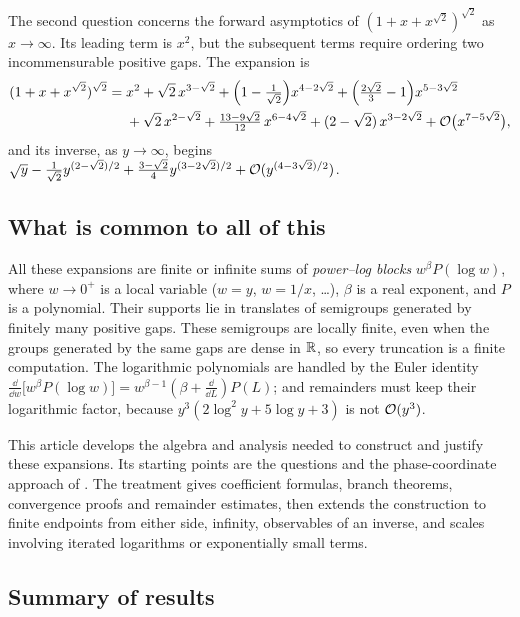 The second question \cite{q2} concerns the forward asymptotics of $(1+x+x^{\sqrt2})^{\sqrt2}$ as $x\to\infty$. Its leading term is $x^2$, but the subsequent terms require ordering two incommensurable positive gaps. The expansion is
\begin{equation}
\begin{aligned}
 (1+x+x^{\sqrt2})^{\sqrt2}={}&x^2+\sqrt2\,x^{3-\sqrt2}+\Bigl(1-\tfrac1{\sqrt2}\Bigr)x^{4-2\sqrt2}+\Bigl(\tfrac{2\sqrt2}{3}-1\Bigr)x^{5-3\sqrt2}\\
 &+\sqrt2\,x^{2-\sqrt2}+\tfrac{13-9\sqrt2}{12}\,x^{6-4\sqrt2}+(2-\sqrt2)\,x^{3-2\sqrt2}+\mathcal O\bigl(x^{7-5\sqrt2}\bigr),
\end{aligned}
 \label{eq:answer3}
\end{equation}
and its inverse, as $y\to\infty$, begins $\sqrt y-\tfrac1{\sqrt2}y^{(2-\sqrt2)/2}+\tfrac{3-\sqrt2}{4}y^{(3-2\sqrt2)/2}+\mathcal O(y^{(4-3\sqrt2)/2})$.

\subsection{What is common to all of this}

All these expansions are finite or infinite sums of \emph{power--log blocks} $w^\beta P(\log w)$, where $w\to0^+$ is a local variable ($w=y$, $w=1/x$, \dots), $\beta$ is a real exponent, and $P$ is a polynomial. Their supports lie in translates of semigroups generated by finitely many positive gaps. These semigroups are locally finite, even when the groups generated by the same gaps are dense in $\mathbb R$, so every truncation is a finite computation. The logarithmic polynomials are handled by the Euler identity $\frac{\dd}{\dd w}\bigl[w^\beta P(\log w)\bigr]=w^{\beta-1}(\beta+\tfrac{\dd}{\dd L})P(L)$; and remainders must keep their logarithmic factor, because $y^3(2\log^2y+5\log y+3)$ is not $\mathcal O(y^3)$.

This article develops the algebra and analysis needed to construct and justify these expansions. Its starting points are the questions \cite{q1,q2} and the phase-coordinate approach of \cite{proveit}. The treatment gives coefficient formulas, branch theorems, convergence proofs and remainder estimates, then extends the construction to finite endpoints from either side, infinity, observables of an inverse, and scales involving iterated logarithms or exponentially small terms.

\subsection{Summary of results}

